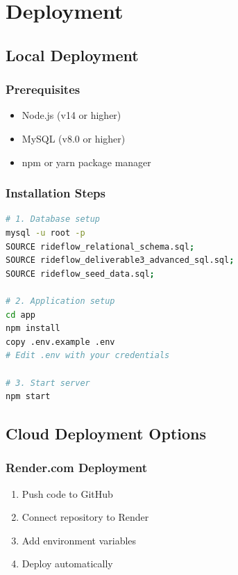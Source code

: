 \documentclass[12pt,a4paper]{report}
\begin{document}
\chapter{Deployment}

\section{Local Deployment}

\subsection{Prerequisites}
\begin{itemize}
    \item Node.js (v14 or higher)
    \item MySQL (v8.0 or higher)
    \item npm or yarn package manager
\end{itemize}

\subsection{Installation Steps}

\begin{lstlisting}[language=bash, caption={Setup commands}]
# 1. Database setup
mysql -u root -p
SOURCE rideflow_relational_schema.sql;
SOURCE rideflow_deliverable3_advanced_sql.sql;
SOURCE rideflow_seed_data.sql;

# 2. Application setup
cd app
npm install
copy .env.example .env
# Edit .env with your credentials

# 3. Start server
npm start
\end{lstlisting}

\section{Cloud Deployment Options}

\subsection{Render.com Deployment}
\begin{enumerate}
    \item Push code to GitHub
    \item Connect repository to Render
    \item Add environment variables
    \item Deploy automatically
\end{enumerate}
\end{document}
